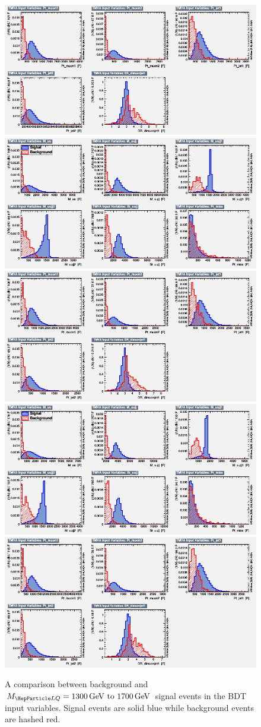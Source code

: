 \begin{figure}[H]
    {\includegraphics[width=.49\textwidth]{Images/Analysis/Results_LQToBMu_pair_uubj_BDTG_FullRun2_2023_01_25_020318/1500/variables_id_c2.png}}
    {\includegraphics[width=.49\textwidth]{Images/Analysis/Results_LQToBMu_pair_uubj_BDTG_FullRun2_2023_01_25_020318/1600/variables_id_c1.png}}
    {\includegraphics[width=.49\textwidth]{Images/Analysis/Results_LQToBMu_pair_uubj_BDTG_FullRun2_2023_01_25_020318/1600/variables_id_c2.png}}
    {\includegraphics[width=.49\textwidth]{Images/Analysis/Results_LQToBMu_pair_uubj_BDTG_FullRun2_2023_01_25_020318/1700/variables_id_c1.png}}
    {\includegraphics[width=.49\textwidth]{Images/Analysis/Results_LQToBMu_pair_uubj_BDTG_FullRun2_2023_01_25_020318/1700/variables_id_c2.png}}
    \caption{A comparison between background and $\MLQ = \SIrange{1300}{1700}{GeV}$ signal events in the BDT input variables. Signal events are solid blue while background events are hashed red.}
    \label{figapp:variables3}
\end{figure}

